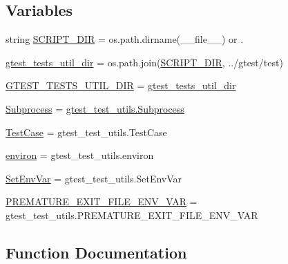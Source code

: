 \subsection*{Variables}
\begin{DoxyCompactItemize}
\item 
string \hyperlink{namespacegmock__test__utils_a4ef94affd9d889f78d67be80017eeddd}{S\+C\+R\+I\+P\+T\+\_\+\+D\+IR} = os.\+path.\+dirname(\+\_\+\+\_\+file\+\_\+\+\_\+) or \textquotesingle{}.\textquotesingle{}
\item 
\hyperlink{namespacegmock__test__utils_af6d94170502149e7f99cfa73ddc13c00}{gtest\+\_\+tests\+\_\+util\+\_\+dir} = os.\+path.\+join(\hyperlink{namespacegmock__test__utils_a4ef94affd9d889f78d67be80017eeddd}{S\+C\+R\+I\+P\+T\+\_\+\+D\+IR}, \textquotesingle{}../gtest/test\textquotesingle{})
\item 
\hyperlink{namespacegmock__test__utils_ae7ee9324ba489b3cbd99c5e26006eba9}{G\+T\+E\+S\+T\+\_\+\+T\+E\+S\+T\+S\+\_\+\+U\+T\+I\+L\+\_\+\+D\+IR} = \hyperlink{namespacegmock__test__utils_af6d94170502149e7f99cfa73ddc13c00}{gtest\+\_\+tests\+\_\+util\+\_\+dir}
\item 
\hyperlink{namespacegmock__test__utils_a31a0e33565ec805d314cb0a4eb8317e6}{Subprocess} = \hyperlink{classgtest__test__utils_1_1_subprocess}{gtest\+\_\+test\+\_\+utils.\+Subprocess}
\item 
\hyperlink{namespacegmock__test__utils_a959c5af591e4d49b6d35745205b64509}{Test\+Case} = gtest\+\_\+test\+\_\+utils.\+Test\+Case
\item 
\hyperlink{namespacegmock__test__utils_a6f0938b5e8839ebc847b52a38f4d35e3}{environ} = gtest\+\_\+test\+\_\+utils.\+environ
\item 
\hyperlink{namespacegmock__test__utils_ab0c69f8ce649fdd5a17f99deedf3eb29}{Set\+Env\+Var} = gtest\+\_\+test\+\_\+utils.\+Set\+Env\+Var
\item 
\hyperlink{namespacegmock__test__utils_a9392c288e6da3024d65ec0bddc0d86c3}{P\+R\+E\+M\+A\+T\+U\+R\+E\+\_\+\+E\+X\+I\+T\+\_\+\+F\+I\+L\+E\+\_\+\+E\+N\+V\+\_\+\+V\+AR} = gtest\+\_\+test\+\_\+utils.\+P\+R\+E\+M\+A\+T\+U\+R\+E\+\_\+\+E\+X\+I\+T\+\_\+\+F\+I\+L\+E\+\_\+\+E\+N\+V\+\_\+\+V\+AR
\end{DoxyCompactItemize}


\subsection{Function Documentation}
\mbox{\label{namespacegmock__test__utils_a9146f81ff42389086b3eaee25dbf0263}} 
